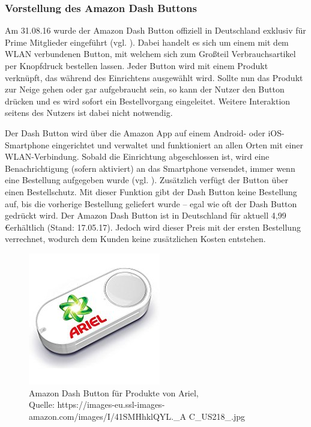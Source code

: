 \subsubsection{Vorstellung des Amazon Dash Buttons}        
\label{sec:Vorstellung des Amazon Dash Buttons} 
Am 31.08.16 wurde der Amazon Dash Button offiziell in Deutschland exklusiv für Prime Mitglieder eingeführt (vgl. \cite{ONLINE.31.08.2016}).
Dabei handelt es sich um einem mit dem \ac{WLAN} verbundenen Button, mit welchem sich zum Großteil Verbrauchsartikel per Knopfdruck bestellen lassen.
Jeder Button wird mit einem Produkt verknüpft, das während des Einrichtens ausgewählt wird.
Sollte nun das Produkt zur Neige gehen oder gar aufgebraucht sein, so kann der Nutzer den Button drücken und es wird sofort ein Bestellvorgang eingeleitet.
Weitere Interaktion seitens des Nutzers ist dabei nicht notwendig.

Der Dash Button wird über die Amazon App auf einem Android- oder iOS-Smartphone eingerichtet und verwaltet und funktioniert an allen Orten mit einer \ac{WLAN}-Verbindung.
Sobald die Einrichtung abgeschlossen ist, wird eine Benachrichtigung (sofern aktiviert) an das Smartphone versendet, immer wenn eine Bestellung aufgegeben wurde (vgl. \cite{.dash}).
Zusätzlich verfügt der Button über einen Bestellschutz.
Mit dieser Funktion gibt der Dash Button keine Bestellung auf, bis die vorherige Bestellung geliefert wurde – egal wie oft der Dash Button gedrückt wird.
Der Amazon Dash Button ist in Deutschland für aktuell 4,99  \euro  erhältlich (Stand: 17.05.17).
Jedoch wird dieser Preis mit der ersten Bestellung verrechnet, wodurch dem Kunden keine zusätzlichen Kosten entstehen.

\begin{figure}[!htb]
	\centering
	\includegraphics[scale=0.5]{Dash.jpg}
	\caption[Amazon Dash Button für Produkte von Ariel]{Amazon Dash Button für Produkte von Ariel,\\ Quelle: https://images-eu.ssl-images-amazon.com/images/I/41SMHhklQYL.\_A
	C\_US218\_.jpg}
\end{figure}

